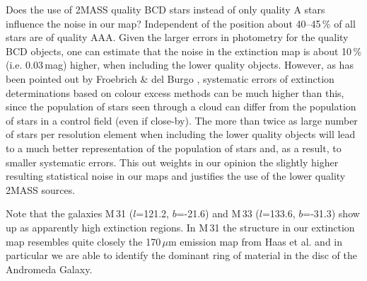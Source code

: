 \documentclass[useAMS,usenatbib]{mn2e}
\begin{document}
Does the use of 2MASS quality BCD stars instead of only quality A stars
influence the noise in our map? Independent of the position about 40--45\,\% of
all stars are of quality AAA. Given the larger errors in photometry for the
quality BCD objects, one can estimate that the noise in the extinction map is
about 10\,\% (i.e. 0.03\,mag) higher, when including the lower quality objects.
However, as has been pointed out by Froebrich \& del Burgo
\cite{2006MNRAS.369.1901F}, systematic errors of extinction determinations based
on colour excess methods can be much higher than this, since the population of
stars seen through a cloud can differ from the population of stars in a control
field (even if close-by). The more than twice as large number of stars per
resolution element when including the lower quality objects will lead to a much
better representation of the population of stars and, as a result, to smaller
systematic errors. This out weights in our opinion the slightly higher resulting
statistical noise in our maps and justifies the use of the lower quality 2MASS
sources.

Note that the galaxies M\,31 ($l$=121.2, $b$=-21.6) and M\,33 ($l$=133.6,
$b$=-31.3) show up as apparently high extinction regions. In M\,31 the structure
in our extinction map resembles quite closely the 170\,$\mu$m emission map from
Haas et al. \cite{1998A&A...338L..33H} and in particular we are able to identify
the dominant ring of material in the disc of the Andromeda Galaxy. 
\end{document}
